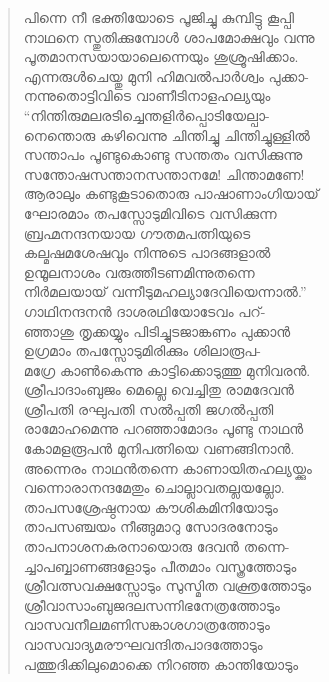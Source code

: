 \begin{verse}
പിന്നെ നീ ഭക്തിയോടെ പൂജിച്ചു കുമ്പിട്ടു കൂപ്പി\\
നാഥനെ സ്തുതിക്കുമ്പോള്‍ ശാപമോക്ഷവും വന്നു\\
പൂതമാനസയായാലെന്നെയും ശുശ്രൂഷിക്കാം.\\
എന്നരുള്‍ചെയ്തു മുനി ഹിമവല്‍പാര്‍ശ്വം പുക്കാ-\\
നന്നുതൊട്ടിവിടെ വാണീടിനാളഹല്യയും\\
“നിന്തിരുമലരടിച്ചെന്തളിര്‍പ്പൊടിയേല്പാ-\\
നെന്തൊരു കഴിവെന്നു ചിന്തിച്ചു ചിന്തിച്ചുള്ളില്‍\\
സന്താപം പൂണ്ടുകൊണ്ടു സന്തതം വസിക്കുന്നു\\
സന്തോഷസന്താനസന്താനമേ! ചിന്താമണേ!\\
ആരാലും കണ്ടുകൂടാതൊരു പാഷാണാംഗിയായ്\\
ഘോരമാം തപസ്സോടുമിവിടെ വസിക്കുന്ന\\
ബ്രഹ്മനന്ദനയായ ഗൗതമപത്നിയുടെ\\
കല്മഷമശേഷവും നിന്നുടെ പാദങ്ങളാല്‍\\
ഉന്മൂലനാശം വരുത്തീടണമിന്നുതന്നെ\\
നിര്‍മലയായ് വന്നീടുമഹല്യാദേവിയെന്നാല്‍.”\\
ഗാഥിനന്ദനന്‍ ദാശരഥിയോടേവം പറ്-\\
ഞ്ഞാശു തൃക്കയ്യും പിടിച്ചുടജാങ്കണം പുക്കാന്‍\\
ഉഗ്രമാം തപസ്സോടുമിരിക്കും ശിലാരൂപ-\\
മഗ്രേ കാണ്‍കെന്നു കാട്ടിക്കൊടുത്തു മുനിവരന്‍.\\
ശ്രീപാദാംബുജം മെല്ലെ വെച്ചിതു രാമദേവന്‍\\
ശ്രീപതി രഘുപതി സല്‍പ്പതി ജഗല്‍പ്പതി\\
രാമോഹമെന്നു പറഞ്ഞാമോദം പൂണ്ടു നാഥന്‍\\
കോമളരൂപന്‍ മുനിപത്നിയെ വണങ്ങിനാന്‍.\\
അന്നെരം നാഥന്‍തന്നെ കാണായിതഹല്യയ്ക്കും\\
വന്നൊരാനന്ദമേതും ചൊല്ലാവതല്ലയല്ലോ.\\
താപസശ്രേഷ്ഠനായ കൗശികമിനിയോടും\\
താപസഞ്ചയം നീങ്ങുമാറു സോദരനോടും\\
താപനാശനകരനായൊരു ദേവന്‍ തന്നെ-\\
ച്ചാപബ്ബാണങ്ങളോടും പീതമാം വസ്ത്രത്തോടും\\
ശ്രീവത്സവക്ഷസ്സോടും സുസ്മിത വക്ത്രത്തോടും\\
ശ്രീവാസാംബുജദലസന്നിഭനേത്രത്തോടും\\
വാസവനീലമണിസങ്കാശഗാത്രത്തോടും\\
വാസവാദ്യമരൗഘവന്ദിതപാദത്തോടും\\
പത്തുദിക്കിലുമൊക്കെ നിറഞ്ഞ കാന്തിയോടും\\

\end{verse}
